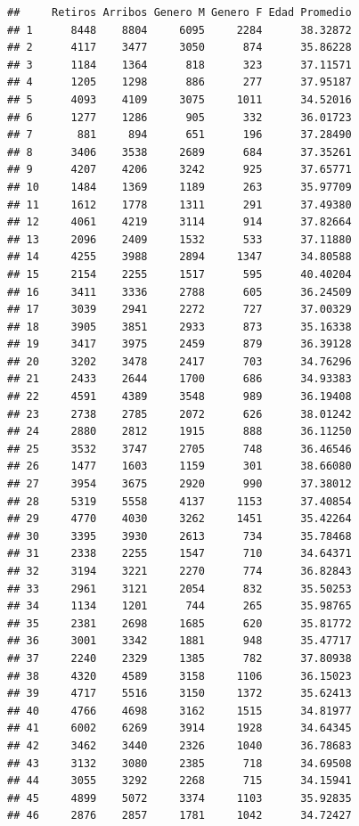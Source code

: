 \documentclass[
]{article}
\begin{document}
\begin{verbatim}
##     Retiros Arribos Genero M Genero F Edad Promedio
## 1      8448    8804     6095     2284      38.32872
## 2      4117    3477     3050      874      35.86228
## 3      1184    1364      818      323      37.11571
## 4      1205    1298      886      277      37.95187
## 5      4093    4109     3075     1011      34.52016
## 6      1277    1286      905      332      36.01723
## 7       881     894      651      196      37.28490
## 8      3406    3538     2689      684      37.35261
## 9      4207    4206     3242      925      37.65771
## 10     1484    1369     1189      263      35.97709
## 11     1612    1778     1311      291      37.49380
## 12     4061    4219     3114      914      37.82664
## 13     2096    2409     1532      533      37.11880
## 14     4255    3988     2894     1347      34.80588
## 15     2154    2255     1517      595      40.40204
## 16     3411    3336     2788      605      36.24509
## 17     3039    2941     2272      727      37.00329
## 18     3905    3851     2933      873      35.16338
## 19     3417    3975     2459      879      36.39128
## 20     3202    3478     2417      703      34.76296
## 21     2433    2644     1700      686      34.93383
## 22     4591    4389     3548      989      36.19408
## 23     2738    2785     2072      626      38.01242
## 24     2880    2812     1915      888      36.11250
## 25     3532    3747     2705      748      36.46546
## 26     1477    1603     1159      301      38.66080
## 27     3954    3675     2920      990      37.38012
## 28     5319    5558     4137     1153      37.40854
## 29     4770    4030     3262     1451      35.42264
## 30     3395    3930     2613      734      35.78468
## 31     2338    2255     1547      710      34.64371
## 32     3194    3221     2270      774      36.82843
## 33     2961    3121     2054      832      35.50253
## 34     1134    1201      744      265      35.98765
## 35     2381    2698     1685      620      35.81772
## 36     3001    3342     1881      948      35.47717
## 37     2240    2329     1385      782      37.80938
## 38     4320    4589     3158     1106      36.15023
## 39     4717    5516     3150     1372      35.62413
## 40     4766    4698     3162     1515      34.81977
## 41     6002    6269     3914     1928      34.64345
## 42     3462    3440     2326     1040      36.78683
## 43     3132    3080     2385      718      34.69508
## 44     3055    3292     2268      715      34.15941
## 45     4899    5072     3374     1103      35.92835
## 46     2876    2857     1781     1042      34.72427

\end{verbatim}
\end{document}
